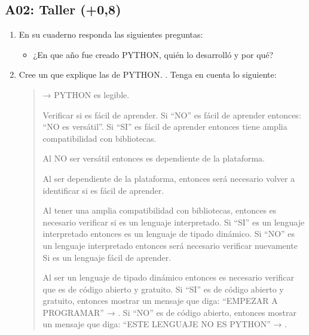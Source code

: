 \documentclass[letterpaper,10pt,spanish]{sphinxmanual}
\begin{document}
\subsection{A02: Taller (+0,8)}
\label{\detokenize{1_guias/10programacion/G1024:a02-taller-0-8}}
\sphinxAtStartPar
{}
\begin{enumerate}
%
\item {} 
\sphinxAtStartPar
En su cuaderno responda las siguientes preguntas:
\begin{itemize}
\item {} 
\sphinxAtStartPar
¿En que año fue creado PYTHON, quién lo desarrolló y por qué?

\end{itemize}

\item {} 
\sphinxAtStartPar
Cree un  que explique las  de PYTHON. . Tenga en cuenta lo siguiente:
\begin{quote}

\sphinxAtStartPar
{} → PYTHON es legible.

\sphinxAtStartPar
Verificar si es fácil de aprender. Si “NO” es fácil de aprender entonces: “NO es versátil”. Si “SI” es fácil de aprender entonces tiene amplia compatibilidad con bibliotecas.

\sphinxAtStartPar
Al NO ser versátil entonces es dependiente de la plataforma.

\sphinxAtStartPar
Al ser dependiente de la plataforma, entonces será necesario volver a identificar si es fácil de aprender.

\sphinxAtStartPar
Al tener una amplia compatibilidad con bibliotecas, entonces es necesario verificar si es un lenguaje interpretado. Si “SI” es un lenguaje interpretado entonces es un lenguaje de tipado dinámico. Si “NO” es un lenguaje interpretado entonces será necesario verificar nuevamente Si es un lenguaje fácil de aprender.

\sphinxAtStartPar
Al ser un lenguaje de tipado dinámico entonces es necesario verificar que es de código abierto y gratuito. Si “SI” es de código abierto y gratuito, entonces mostrar un mensaje que diga: “EMPEZAR A PROGRAMAR” → . Si “NO” es de código abierto, entonces  mostrar un mensaje que diga: “ESTE LENGUAJE NO ES PYTHON” → .
\end{quote}


\end{enumerate}
\end{document}
